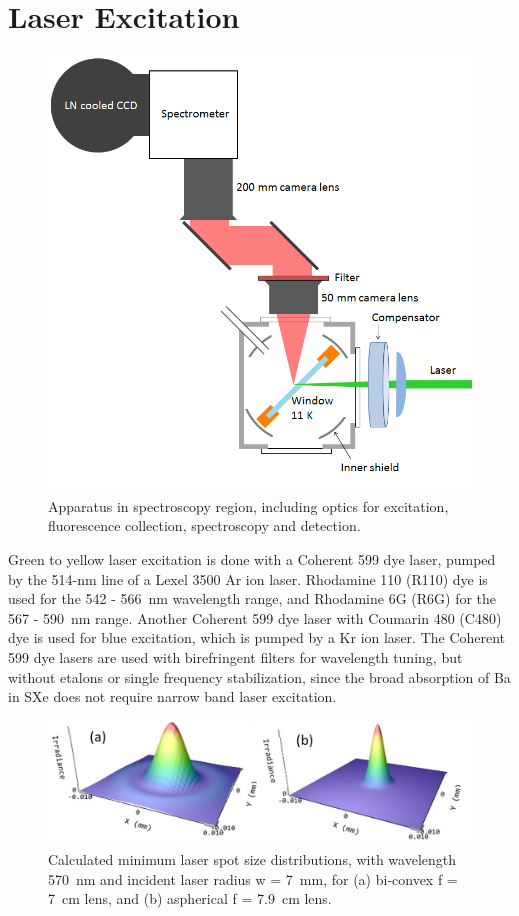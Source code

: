 \section{Laser Excitation}
\label{sec:laser}

\begin{figure} %
        \centering
                \includegraphics[width=.7\textwidth]{figures/window_etc_justOptics.png}
                \caption{Apparatus in spectroscopy region, including optics for excitation, fluorescence collection, spectroscopy and detection.}
\label{fig:endOfBeamOptics}
\end{figure}

Green to yellow laser excitation is done with a Coherent 599 dye laser, pumped by the 514-nm line of a Lexel 3500 Ar ion laser.  Rhodamine 110 (R110) dye is used for the 542 - 566~nm wavelength range, and Rhodamine 6G (R6G) for the 567 - 590~nm range.  Another Coherent 599 dye laser with Coumarin 480 (C480) dye is used for blue excitation, which is pumped by a Kr ion laser.  The Coherent 599 dye lasers are used with birefringent filters for wavelength tuning, but without etalons or single frequency stabilization, since the broad absorption of Ba in SXe does not require narrow band laser excitation.

\begin{figure} %
        \centering
                \includegraphics[width=.7\textwidth]{figures/DFairbank_aber.png}
                \caption{Calculated minimum laser spot size distributions, with wavelength 570~nm and incident laser radius w = 7~mm, for (a) bi-convex f = 7~cm lens, and (b) aspherical f = 7.9~cm lens.  \cite{DFairbank}}
\label{fig:DFairbank}
\end{figure}

